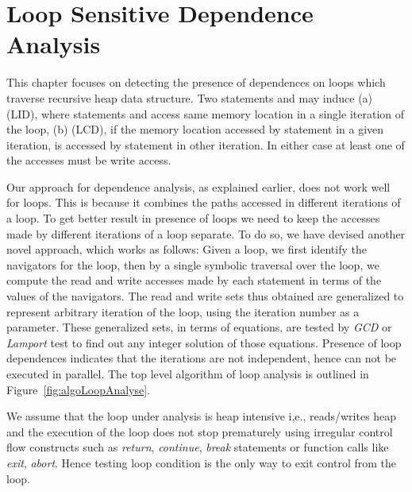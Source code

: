 \chapter{Loop Sensitive Dependence Analysis}
\label{ch:loopdep}
This chapter focuses on detecting the presence of dependences on loops which 
traverse recursive heap data structure. Two statements  and  may induce (a)  (LID), where statements  and 
access same memory location in a single iteration of the loop, (b)  (LCD), if the 
memory location accessed by statement  in a given iteration, is accessed 
by statement  in other iteration. In either case at least one of the accesses must be write access. 

Our approach for dependence analysis, as explained earlier, does not work well 
for loops. This is because it combines the paths accessed in different iterations 
of a loop.  To get better result in
presence of loops we need to keep the accesses made by
different iterations of a loop separate. To do so, we have
devised another novel approach, which works as follows: Given
a loop, we first identify the navigators for the loop,
then by a single symbolic traversal over the loop, we compute
the read and write accesses made by each statement in terms
of the values of the navigators. The read and write sets thus
obtained are generalized to represent arbitrary iteration of
the loop, using the iteration number as a parameter. These generalized 
sets, in terms of equations, are tested by \emph{GCD} or \emph{Lamport} test 
to find out any integer solution of those equations. Presence of loop dependences
indicates that the iterations are not independent, hence 
can not be executed in parallel. The top level algorithm of loop analysis is 
outlined in Figure~\ref{fig:algoLoopAnalyse}.

We assume that the loop under analysis is heap intensive i,e., 
reads/writes heap and the execution of the loop does not stop 
prematurely using irregular control flow constructs 
such as \emph{return}, \emph{continue}, \emph{break} 
statements or function calls like \emph{exit}, \emph{abort}. 
Hence testing loop condition is the only way to exit 
control from the loop. 

